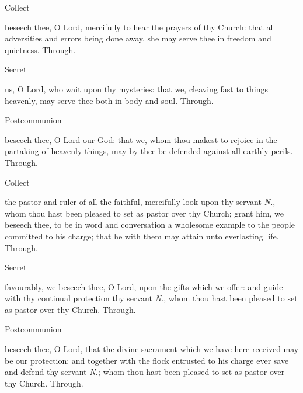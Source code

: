    \label{SPAgainst}
   \begin{inhead}
   	Collect
   \end{inhead}
    beseech thee, O Lord, mercifully to hear the prayers of thy Church: that all adversities and errors being done away, she may serve thee in freedom and quietness. Through.
  \begin{inhead}
  	Secret
  \end{inhead}
    us, O Lord, who wait upon thy mysteries: that we, cleaving fast to things heavenly, may serve thee both in body and soul. Through.
   \begin{inhead}
   	Postcommunion
   \end{inhead}
    beseech thee, O Lord our God: that we, whom thou makest to rejoice in the partaking of heavenly things, may by thee be defended against all earthly perils. Through.
   
   \label{SPChiefBishop}
   \begin{inhead}
   	Collect
   \end{inhead}
    the pastor and ruler of all the faithful, mercifully look upon thy servant \emph{N.}, whom thou hast been pleased to set as pastor over thy Church; grant him, we beseech thee, to be in word and conversation a wholesome example to the people committed to his charge; that he with them may attain unto everlasting life. Through.
  \begin{inhead}
  	Secret
  \end{inhead}
    favourably, we beseech thee, O Lord, upon the gifts which we offer: and guide with thy continual protection thy servant \textit{N.}, whom thou hast been pleased to set as pastor over thy Church. Through.
   \begin{inhead}
   	Postcommunion
   \end{inhead}
    beseech thee, O Lord, that the divine sacrament which we have here received may be our protection: and together with the flock entrusted to his charge ever save and defend thy servant \textit{N.}; whom thou hast been pleased to set as pastor over thy Church. Through.
   
